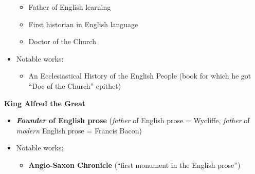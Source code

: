 \documentclass[
  12pt,
    progressbar=frametitle]{beamer}
\providecommand{\tightlist}{%
  \setlength{\itemsep}{0pt}\setlength{\parskip}{0pt}}
\begin{document}
\begin{frame}[allowframebreaks]
\begin{itemize}
  \begin{itemize}
  \tightlist
  \item
    Father of English learning
  \item
    First historian in English language
  \item
    Doctor of the Church
  \end{itemize}
\item
  Notable works:

  \begin{itemize}
  \tightlist
  \item
    An Ecclesiastical History of the English People (book for which he
    got ``Doc of the Church'' epithet)
  \end{itemize}
\end{itemize}

\large\textbf{King Alfred the Great}\normalsize\vspace{-3mm}

\begin{itemize}
\tightlist
\item
  \textbf{\emph{Founder} of English prose} (\emph{father} of English
  prose = Wycliffe, \emph{father} of \emph{modern} English prose =
  Francis Bacon)
\item
  Notable works:

  \begin{itemize}
  \tightlist
  \item
    \textbf{Anglo-Saxon Chronicle} (``first monument in the English
    prose'')
  \end{itemize}
\end{itemize}
\end{frame}
\end{document}

